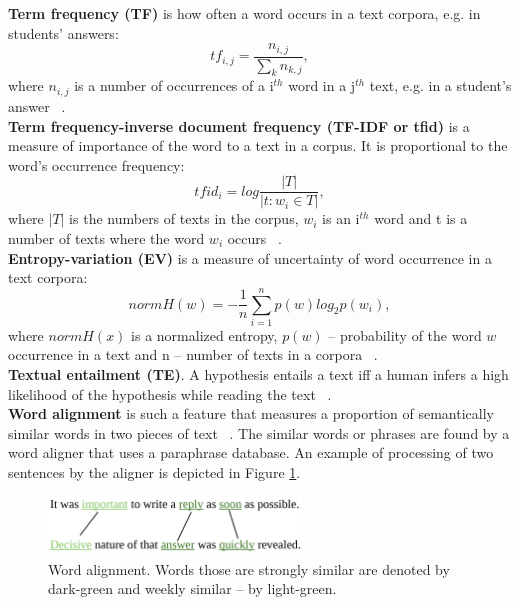 \textbf{Term frequency (TF)}  is how often a word occurs in a text corpora, e.g. in students' answers:
\begin{equation} \label{eq:tf}
tf_{i,j} = \frac{n_{i,j}}{\sum_k n_{k,j}},
\end{equation}
where $n_{i,j}$ is a number of occurrences of a i$^{th}$ word in a j$^{th}$ text, e.g. in a student's answer ~\cite{Hou}.\\

\textbf{Term frequency-inverse document frequency (TF-IDF or tfid)} is a measure of importance of the word to a text in a corpus. It is proportional to the word's occurrence frequency:
\begin{equation} \label{eq:tfid}
tfid_i = log\frac{|T|}{|{t:w_i \in T}|},
\end{equation}
where $|T|$ is the numbers of texts in the corpus, $w_i$ is an i$^{th}$ word and t is a number of texts where the word $w_i$ occurs ~\cite{Hou}.\\

\textbf{Entropy-variation (EV)} is a measure of uncertainty of word occurrence in a text corpora:
\begin{equation} \label{eq:ev}
normH(w) = -\frac{1}{n}\sum^n_{i=1}p(w)log_2p(w_i),
\end{equation}
where $normH(x)$ is a normalized entropy, $p(w)$ -- probability of the word $w$ occurrence in a text and n -- number of texts in a corpora ~\cite{Hou}.\\

\textbf{Textual entailment (TE)}. A hypothesis entails a text iff a human infers a high likelihood of the hypothesis while reading the text ~\cite{SemEval}.\\

\textbf{Word alignment} is such a feature that measures a proportion of semantically similar words in two pieces of text ~\cite{Sultan}. The similar words or phrases are found by a word aligner that uses a paraphrase database. An example of processing of two sentences by the aligner is depicted in Figure \ref{fig:align}.

\begin{figure}[h!]
  \centering
  \includegraphics[width=0.6\textwidth]{img/align}
    \caption{Word alignment. Words those are strongly similar are denoted by dark-green and weekly similar -- by light-green. \label{fig:align}}
\end{figure}

